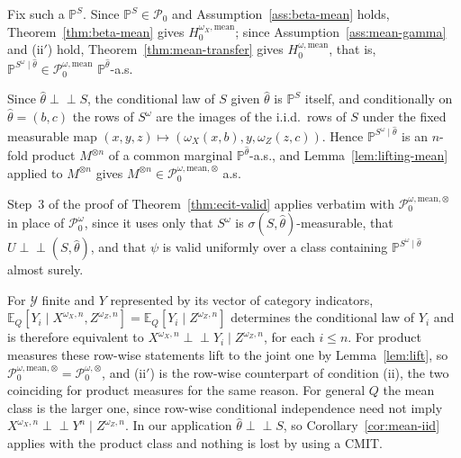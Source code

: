 \documentclass[twoside,11pt]{article}
\newcommand{\indep}{\perp \!\!\! \perp}
\begin{document}
\begin{proofE}
Fix such a $\mathbb P^{S}$. Since $\mathbb P^{S}\in\mathcal P_0$ and
Assumption~\ref{ass:beta-mean} holds, Theorem~\ref{thm:beta-mean} gives
$H_0^{\omega_X,\mathrm{mean}}$; since Assumption~\ref{ass:mean-gamma} and (ii$'$) hold,
Theorem~\ref{thm:mean-transfer} gives $H_0^{\omega,\mathrm{mean}}$, that is,
$\mathbb P^{S^\omega\mid\hat\theta}\in\mathcal P_0^{\omega,\mathrm{mean}}$
$\mathbb P^{\hat\theta}$-a.s.

Since $\hat\theta\indep S$, the conditional law of $S$ given $\hat\theta$ is
$\mathbb P^{S}$ itself, and conditionally on $\hat\theta=(b,c)$ the rows of $S^\omega$ are
the images of the i.i.d.\ rows of $S$ under the fixed measurable map
$(x,y,z)\mapsto(\omega_X(x,b),y,\omega_Z(z,c))$. Hence
$\mathbb P^{S^\omega\mid\hat\theta}$ is an $n$-fold product $M^{\otimes n}$ of a common
marginal $\mathbb P^{\hat\theta}$-a.s., and Lemma~\ref{lem:lifting-mean} applied to
$M^{\otimes n}$ gives $M^{\otimes n}\in\mathcal P_0^{\omega,\mathrm{mean},\otimes}$ a.s.

Step~3 of the proof of Theorem~\ref{thm:ecit-valid} applies verbatim with
$\mathcal P_0^{\omega,\mathrm{mean},\otimes}$ in place of $\mathcal P_0^\omega$, since it
uses only that $S^\omega$ is $\sigma(S,\hat\theta)$-measurable, that
$U\indep(S,\hat\theta)$, and that $\psi$ is valid uniformly over a class containing
$\mathbb P^{S^\omega\mid\hat\theta}$ almost surely.
\end{proofE}

\begin{remark}[Categorical $Y$]\label{remark:equivalence_ci_mean_cat_Y}
For $\mathcal Y$ finite and $Y$ represented by its vector of category indicators,
$\mathbb E_Q[Y_i\mid X^{\omega_X,n},Z^{\omega_Z,n}]=\mathbb E_Q[Y_i\mid Z^{\omega_Z,n}]$ determines the
conditional law of $Y_i$ and is therefore equivalent to $X^{\omega_X,n}\indep Y_i\mid Z^{\omega_Z,n}$,
for each $i\le n$. For product measures these row-wise statements lift to the joint one by
Lemma~\ref{lem:lift}, so $\mathcal P_0^{\omega,\mathrm{mean},\otimes}=\mathcal P_0^{\omega,\otimes}$,
and (ii$'$) is the row-wise counterpart of condition (ii), the two coinciding for product measures for the same reason.
For general $Q$ the mean class is the larger one, since row-wise conditional independence need not
imply $X^{\omega_X,n}\indep Y^n\mid Z^{\omega_Z,n}$. In our application
$\hat\theta\indep S$, so Corollary~\ref{cor:mean-iid} applies with the product class and nothing is
lost by using a CMIT.
\end{remark}
\end{document}
